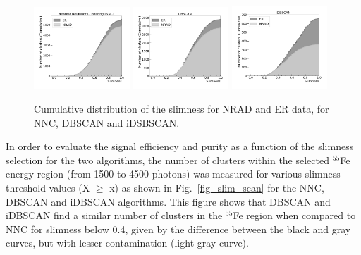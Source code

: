 \documentclass[a4paper,11pt]{article}
\begin{document}
\begin{figure}[ht]
\centering
\includegraphics[width=0.32\textwidth]{CDF_Slimness_2D.pdf}
\includegraphics[width=0.32\textwidth]{CDF_Slimness_1D.pdf}
\includegraphics[width=0.32\textwidth]{CDF_Slimness_3D.pdf}
\caption{Cumulative distribution of the slimness for NRAD and ER data, for NNC, DBSCAN and iDSBSCAN.} 
\label{fig_cdf_slim}
\end{figure}


In order to evaluate the signal efficiency and purity as a function of the slimness selection for the two algorithms, the number of clusters within the selected $^{55}$Fe energy region (from 1500 to 4500 photons) was measured for various slimness threshold values (X $\geqslant$ x) as shown in Fig.~\ref{fig_slim_scan} for the NNC, DBSCAN and iDBSCAN algorithms.
This figure shows that DBSCAN and iDBSCAN find a similar number of clusters in the $^{55}$Fe region when compared to NNC for slimness below 0.4, given by the difference between the black and gray curves, but with lesser contamination (light gray curve).
\end{document}
